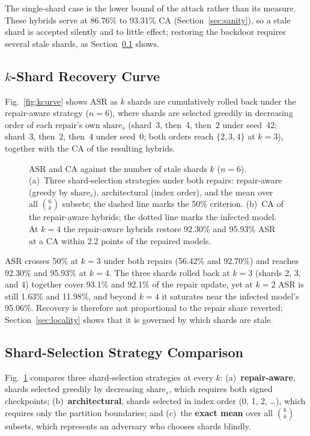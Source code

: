 \documentclass[conference,a4paper]{IEEEtran}  %
\begin{document}
The single-shard case is the lower bound of the attack rather than its measure. These hybrids serve at 86.76\% to 93.31\% CA (Section~\ref{sec:sanity}), so a stale shard is accepted silently and to little effect; restoring the backdoor requires several stale shards, as Section~\ref{sec:kcurve} shows.

\subsection{\texorpdfstring{\(k\)}{k}-Shard Recovery Curve}
\label{sec:kcurve}
Fig.~\ref{fig:kcurve} shows ASR as $k$ shards are cumulatively rolled back under the repair-aware strategy ($n\!=\!6$), where shards are selected greedily in decreasing order of each repair's own $\mathrm{share}_s$ (shard~3, then~4, then~2 under seed~42; shard~3, then~2, then~4 under seed~0; both orders reach $\{2,3,4\}$ at $k=3$), together with the CA of the resulting hybrids.

\begin{figure}[t]
\centering

\caption{ASR and CA against the number of stale shards $k$ ($n=6$). (a)~Three shard-selection strategies under both repairs: repair-aware (greedy by $\mathrm{share}_s$), architectural (index order), and the mean over all $\binom{6}{k}$ subsets; the dashed line marks the 50\% criterion. (b)~CA of the repair-aware hybrids; the dotted line marks the infected model. At $k=4$ the repair-aware hybrids restore 92.30\% and 95.93\% ASR at a CA within 2.2 points of the repaired models.}
\label{fig:kcurve}\label{fig:strategy}
\end{figure}

ASR crosses 50\% at $k=3$ under both repairs (56.42\% and 92.70\%) and reaches 92.30\% and 95.93\% at $k=4$. The three shards rolled back at $k=3$ (shards 2, 3, and 4) together cover 93.1\% and 92.1\% of the repair update, yet at $k=2$ ASR is still 1.63\% and 11.98\%, and beyond $k=4$ it saturates near the infected model's 95.06\%. Recovery is therefore not proportional to the repair share reverted; Section~\ref{sec:locality} shows that it is governed by which shards are stale.

\subsection{Shard-Selection Strategy Comparison}
\label{sec:strategy}
Fig.~\ref{fig:strategy} compares three shard-selection strategies at every $k$: (a)~\textbf{repair-aware}, shards selected greedily by decreasing $\mathrm{share}_s$, which requires both signed checkpoints; (b)~\textbf{architectural}, shards selected in index order (0, 1, 2, \ldots), which requires only the partition boundaries; and (c)~the \textbf{exact mean} over all $\binom{6}{k}$ subsets, which represents an adversary who chooses shards blindly.
\end{document}
